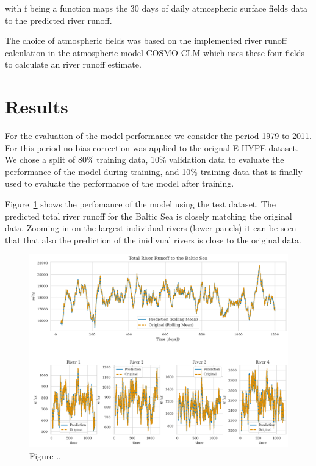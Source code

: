 \documentclass[
]{agujournal2019}
\begin{document}
with f being a function maps the 30 days of daily atmospheric surface
fields data to the predicted river runoff.

The choice of atmospheric fields was based on the implemented river
runoff calculation in the atmospheric model COSMO-CLM which uses these
four fields to calculate an river runoff estimate.

\hypertarget{results}{%
\section{Results}\label{results}}

For the evaluation of the model performance we consider the period 1979
to 2011. For this period no bias correction was applied to the orignal
E-HYPE dataset. We chose a split of 80\% training data, 10\% validation
data to evaluate the performance of the model during training, and 10\%
training data that is finally used to evaluate the performance of the
model after training.

Figure~\ref{fig-PerformanceNeuralNetworkRunoff} shows the perfomance of
the model using the test dataset. The predicted total river runoff for
the Baltic Sea is closely matching the original data. Zooming in on the
largest individual rivers (lower panels) it can be seen that that also
the prediction of the inidivual rivers is close to the original data.

\begin{figure}

{\centering \includegraphics{images/paste-1.png}

}

\caption{\label{fig-PerformanceNeuralNetworkRunoff}Figure ..}

\end{figure}
\end{document}
